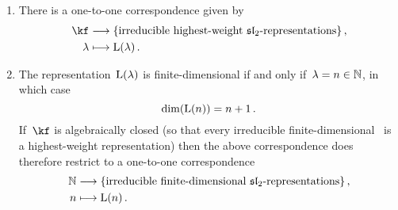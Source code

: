 \documentclass[a4paper, 11pt, oneside]{scrartcl}
\begin{document}
\begin{theorem}
  \leavevmode
  \begin{enumerate}
    \item
      There is a one-to-one correspondence given by
      \begin{align*}
        \kf
        &\longto
        \{
          \text{irreducible highest-weight~\representations{$\sllie_2$}}
        \} \,,
        \\
        \lambda
        &\longmapsto
        \irred(\lambda) \,.
      \end{align*}
    \item
      The representation~$\operatorname{L}(\lambda)$ is finite-dimensional if and only if~$\lambda = n \in \mathbb{N}$, in which case
      \[
        \dim(\operatorname{L}(n))
        =
        n + 1 \,.
      \]
      If~$\kf$ is algebraically closed (so that every irreducible finite-dimensional~ is a highest-weight representation) then the above correspondence does therefore restrict to a one-to-one correspondence
      \begin{align*}
        \Natural
        &\longto
        \{ 
          \text{irreducible finite-dimensional~\representations{$\sllie_2$}}
        \} \,,
        \\
        n
        &\longmapsto
        \irred(n) \,.
      \end{align*}
  \end{enumerate}
\end{theorem}
\end{document}
